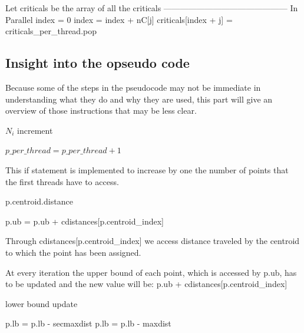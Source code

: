 \documentclass{report}
\begin{document}
{\begin{minipage}[b]{0.48\textwidth}
\begin{algorithm}[H]
\begin{algorithmic}
        \State Let criticals be the array of all the criticals
        \State --------------------------------------------- \Comment In Parallel 
        \State index = 0
          \State index = index + nC[j]
        \EndFor
        \State 
          \State criticals[index + j] = criticals\_per\_thread.pop 
        \EndFor
      \end{algorithmic}
  \end{algorithm}
  \end{minipage}}

  \newpage

  \begin{minipage}[b]{0.48\textwidth}
    \subsection*{Insight into the opseudo code}
    Because some of the steps in the pseudocode may not be immediate in understanding what they do and why they are used, this part will give an overview of those instructions that may be less clear.
    \begin{algorithm}[H]
      \caption{$N_i$ increment}
      \begin{algorithmic}
          \State $p\_per\_thread = p\_per\_thread + 1$
        \EndIf
      \end{algorithmic}
    \end{algorithm}

    This if statement is implemented to increase by one the number of points that the first threads have to access.

    \begin{algorithm}[H]
      \caption{p.centroid.distance}
      \begin{algorithmic}
        \State p.ub = p.ub + cdistances[p.centroid\_index]
      \end{algorithmic}
    \end{algorithm}

    Through cdistances[p.centroid\_index] we access distance traveled by the centroid to which the point has been assigned.

    At every iteration the upper bound of each point, which is accessed by p.ub, has to be updated and the new value will be: p.ub + cdistances[p.centroid\_index]

    \begin{algorithm}[H]
      \caption{lower bound update}
      \begin{algorithmic}
          \State p.lb = p.lb - secmaxdist
        \Else
          \State p.lb = p.lb - maxdist
        \EndIf
      \end{algorithmic}
    \end{algorithm}


\end{minipage}
\end{document}
